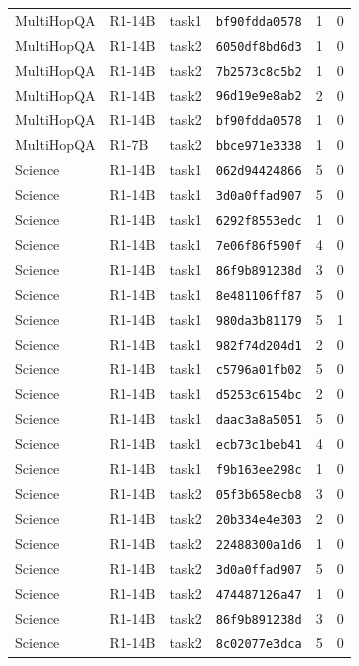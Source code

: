 \begin{longtable}{llllrr}
MultiHopQA & R1-14B & task1 & \texttt{bf90fdda0578} & 1 & 0 \\
MultiHopQA & R1-14B & task2 & \texttt{6050df8bd6d3} & 1 & 0 \\
MultiHopQA & R1-14B & task2 & \texttt{7b2573c8c5b2} & 1 & 0 \\
MultiHopQA & R1-14B & task2 & \texttt{96d19e9e8ab2} & 2 & 0 \\
MultiHopQA & R1-14B & task2 & \texttt{bf90fdda0578} & 1 & 0 \\
MultiHopQA & R1-7B & task2 & \texttt{bbce971e3338} & 1 & 0 \\
Science & R1-14B & task1 & \texttt{062d94424866} & 5 & 0 \\
Science & R1-14B & task1 & \texttt{3d0a0ffad907} & 5 & 0 \\
Science & R1-14B & task1 & \texttt{6292f8553edc} & 1 & 0 \\
Science & R1-14B & task1 & \texttt{7e06f86f590f} & 4 & 0 \\
Science & R1-14B & task1 & \texttt{86f9b891238d} & 3 & 0 \\
Science & R1-14B & task1 & \texttt{8e481106ff87} & 5 & 0 \\
Science & R1-14B & task1 & \texttt{980da3b81179} & 5 & 1 \\
Science & R1-14B & task1 & \texttt{982f74d204d1} & 2 & 0 \\
Science & R1-14B & task1 & \texttt{c5796a01fb02} & 5 & 0 \\
Science & R1-14B & task1 & \texttt{d5253c6154bc} & 2 & 0 \\
Science & R1-14B & task1 & \texttt{daac3a8a5051} & 5 & 0 \\
Science & R1-14B & task1 & \texttt{ecb73c1beb41} & 4 & 0 \\
Science & R1-14B & task1 & \texttt{f9b163ee298c} & 1 & 0 \\
Science & R1-14B & task2 & \texttt{05f3b658ecb8} & 3 & 0 \\
Science & R1-14B & task2 & \texttt{20b334e4e303} & 2 & 0 \\
Science & R1-14B & task2 & \texttt{22488300a1d6} & 1 & 0 \\
Science & R1-14B & task2 & \texttt{3d0a0ffad907} & 5 & 0 \\
Science & R1-14B & task2 & \texttt{474487126a47} & 1 & 0 \\
Science & R1-14B & task2 & \texttt{86f9b891238d} & 3 & 0 \\
Science & R1-14B & task2 & \texttt{8c02077e3dca} & 5 & 0 \\

\end{longtable}
